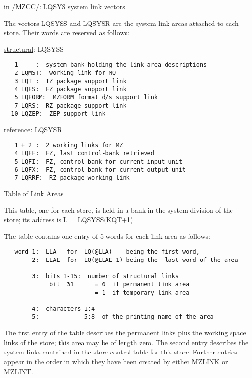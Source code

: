 \begin{flushright} \ul{\large in /MZCC/:  LQSYS system link vectors}
\end{flushright}

The vectors LQSYSS and LQSYSR are the system link areas
attached to each store.
Their words are reserved as follows:

\vspace{4mm}
\ul{structural}: LQSYSS

\begin{verbatim}
   1     :  system bank holding the link area descriptions
   2 LQMST:  working link for MQ
   3 LQT :  TZ package support link
   4 LQFS:  FZ package support link
   5 LQFORM:  MZFORM format d/s support link
   7 LQRS:  RZ package support link
  10 LQZEP:  ZEP support link
\end{verbatim} 

\ul{reference}: LQSYSR

\begin{verbatim}
   1 + 2 :  2 working links for MZ
   4 LQFF:  FZ, last control-bank retrieved
   5 LQFI:  FZ, control-bank for current input unit
   6 LQFX:  FZ, control-bank for current output unit
   7 LQRRF:  RZ package working link
\end{verbatim} 

\begin{flushright} \ul{\large Table of Link Areas}
\end{flushright}

This table, one for each store,
is held in a bank in the system division of the store;
its address is  L = LQSYSS(KQT+1)

The table contains one entry of 5 words for each link area
as follows:

\begin{verbatim}
   word 1:  LLA   for  LQ(@LLA)    being the first word,
        2:  LLAE  for  LQ(@LLAE-1) being the  last word of the area

        3:  bits 1-15:  number of structural links
             bit  31      = 0  if permanent link area
                          = 1  if temporary link area

        4:  characters 1:4
        5:             5:8  of the printing name of the area
\end{verbatim} 

The first entry of the table describes the permanent links
plus the working space links of the store;
this area may be of length zero.
The second entry describes the system links contained in
the store control table for this store.
Further entries appear in the order in which they have been
created by either MZLINK or MZLINT.

